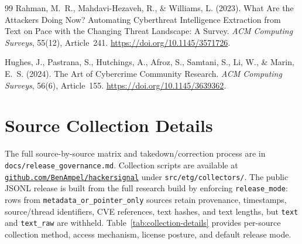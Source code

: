 \documentclass{article}
\begin{document}
\begin{thebibliography}{99}
Rahman, M.\ R., Mahdavi-Hezaveh, R., \& Williams, L. (2023).
What Are the Attackers Doing Now? Automating Cyberthreat Intelligence
Extraction from Text on Pace with the Changing Threat Landscape: A Survey.
\textit{ACM Computing Surveys}, 55(12), Article~241.
\url{https://doi.org/10.1145/3571726}.

Hughes, J., Pastrana, S., Hutchings, A., Afroz, S., Samtani, S.,
Li, W., \& Marin, E.\ S. (2024).
The Art of Cybercrime Community Research.
\textit{ACM Computing Surveys}, 56(6), Article~155.
\url{https://doi.org/10.1145/3639362}.

\end{thebibliography}

\appendix

\section{Source Collection Details}
\label{app:collection}

The full source-by-source matrix and takedown/correction process are in \texttt{docs/release\_governance.md}. Collection scripts are available at \href{https://github.com/BenAmpel/hackersignal}{\texttt{github.com/BenAmpel/hackersignal}} under \texttt{src/etg/collectors/}. The public JSONL release is built from the full research build by enforcing \texttt{release\_mode}: rows from \texttt{metadata\_or\_pointer\_only} sources retain provenance, timestamps, source/thread identifiers, CVE references, text hashes, and text lengths, but \texttt{text} and \texttt{text\_raw} are withheld. Table~\ref{tab:collection-details} provides per-source collection method, access mechanism, license posture, and default release mode.
\end{document}
